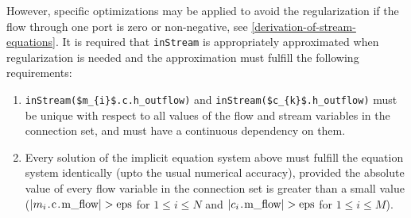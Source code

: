 However, specific optimizations may be applied to avoid the regularization if the flow through one port is zero or non-negative, see \cref{derivation-of-stream-equations}.
It is required that \lstinline!inStream! is appropriately approximated when regularization is needed and the approximation must fulfill the following requirements:
\begin{enumerate}
\item
  \lstinline!inStream($m_{i}$.c.h_outflow)! and
  \lstinline!inStream($c_{k}$.h_outflow)! must be unique with
  respect to all values of the flow and stream variables in the
  connection set, and must have a continuous dependency on them.
\item
  Every solution of the implicit equation system above must fulfill the
  equation system identically (upto the usual numerical
  accuracy), provided the absolute value of every flow variable in
  the connection set is greater than a small value
  ($\abs{m_{i}\text{\lstinline!.c.m_flow!}} > \text{\lstinline!eps!}$ for $1 \leq i \leq N$ and
  $\abs{c_{i}\text{\lstinline!.m_flow!}} > \text{\lstinline!eps!}$ for $1 \leq i \leq M$).
\end{enumerate}

